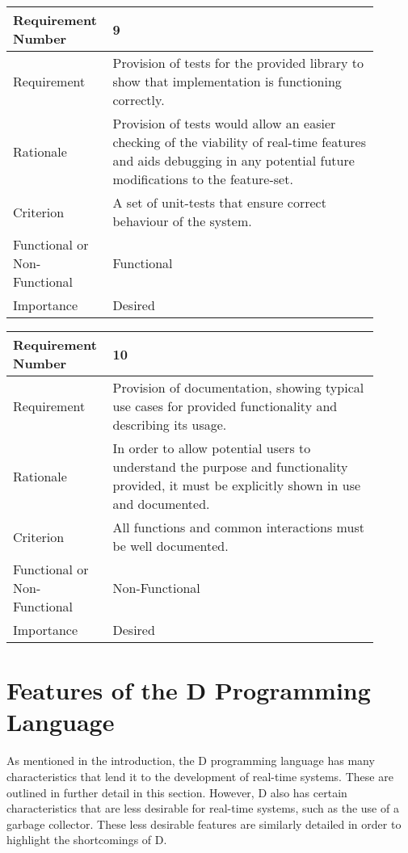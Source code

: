 \begin{table}[!htbp]
\centering
\begin{tabular}{|L{0.2\linewidth}|L{0.7\linewidth}|}
\hline
Requirement Number   & 9 \\ \hline
Requirement & Provision of tests for the provided library to show that 
                implementation is functioning correctly. \\ \hline
Rationale      & Provision of tests would allow an easier checking of the viability of  
                real-time features and aids debugging in any potential future 
                modifications to the feature-set. \\ \hline
Criterion      & A set of unit-tests that ensure correct behaviour of the system. \\ \hline
Functional or Non-Functional & Functional \\ \hline
Importance     & Desired \\ \hline
\end{tabular}
\end{table}
\begin{table}[!htbp]
\centering
\begin{tabular}{|L{0.2\linewidth}|L{0.7\linewidth}|}
\hline
Requirement Number & 10 \\ \hline
Requirement & Provision of documentation, showing typical use cases for provided 
                functionality and describing its usage. \\ \hline
Rationale      & In order to allow potential users to understand the purpose and 
                functionality provided, it must be explicitly shown in use and
                documented.  \\ \hline
Criterion      & All functions and common interactions must be well documented. \\ \hline
Functional or Non-Functional & Non-Functional \\ \hline
Importance     & Desired \\ \hline
\end{tabular}
\end{table}
\FloatBarrier



\section{Features of the D Programming Language}
As mentioned in the introduction, the D programming language has many 
characteristics that lend it to the development of real-time systems.
These are outlined in further detail in this section. 
However, D also has certain characteristics that are less desirable for 
real-time systems, such as the use of a garbage collector. 
These less desirable features are similarly detailed in order to highlight the 
shortcomings of D. 


